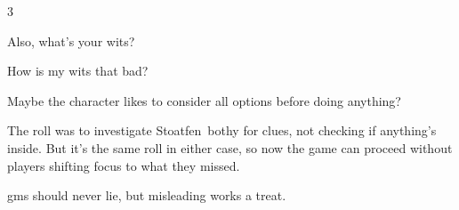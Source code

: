\begin{multicols}{3}
\begin{description}
  Also, what's your wits?
  \item[Player 1:]
  How is my wits that bad?
  \item[\Gls{gm}:]
  Maybe the character likes to consider all options before doing anything?
\end{description}

\bigLine
\vspace{2em}

The roll was to investigate Stoatfen~\Gls{bothy} for clues, not checking if anything's inside.
But it's the same roll in either case, so now the game can proceed without players shifting focus to what they missed.

\Glspl{gm} should never lie, but misleading works a treat.
\end{multicols}

\bigLine

